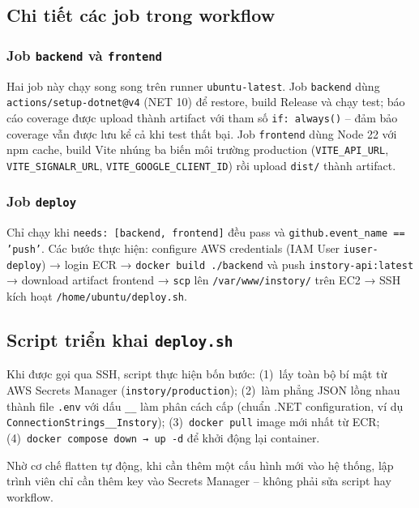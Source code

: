 \documentclass[a4paper]{article}
\begin{document}
\subsection{Chi tiết các job trong workflow}

\subsubsection{Job \texttt{backend} và \texttt{frontend}}

Hai job này chạy song song trên runner \texttt{ubuntu-latest}. Job \texttt{backend}
dùng \texttt{actions/setup-dotnet@v4} (NET 10) để restore, build Release và chạy test;
báo cáo coverage được upload thành artifact với tham số \texttt{if: always()} -- đảm bảo
coverage vẫn được lưu kể cả khi test thất bại. Job \texttt{frontend} dùng Node 22 với
npm cache, build Vite nhúng ba biến môi trường production
(\texttt{VITE\_API\_URL}, \texttt{VITE\_SIGNALR\_URL}, \texttt{VITE\_GOOGLE\_CLIENT\_ID})
rồi upload \texttt{dist/} thành artifact.

\subsubsection{Job \texttt{deploy}}

Chỉ chạy khi \texttt{needs: [backend, frontend]} đều pass và
\texttt{github.event\_name == 'push'}. Các bước thực hiện:
configure AWS credentials (IAM User \texttt{iuser-deploy}) → login ECR →
\texttt{docker build ./backend} và push \texttt{instory-api:latest} → download
artifact frontend → \texttt{scp} lên \texttt{/var/www/instory/} trên EC2 →
SSH kích hoạt \texttt{/home/ubuntu/deploy.sh}.

\subsection{Script triển khai \texttt{deploy.sh}}

Khi được gọi qua SSH, script thực hiện bốn bước:
(1)~lấy toàn bộ bí mật từ AWS Secrets Manager (\texttt{instory/production});
(2)~làm phẳng JSON lồng nhau thành file \texttt{.env} với dấu \texttt{\_\_}
làm phân cách cấp (chuẩn .NET configuration, ví dụ
\texttt{ConnectionStrings\_\_Instory});
(3)~\texttt{docker pull} image mới nhất từ ECR;
(4)~\texttt{docker compose down → up -d} để khởi động lại container.

Nhờ cơ chế flatten tự động, khi cần thêm một cấu hình mới vào hệ thống,
lập trình viên chỉ cần thêm key vào Secrets Manager -- không phải sửa script
hay workflow.
\end{document}
